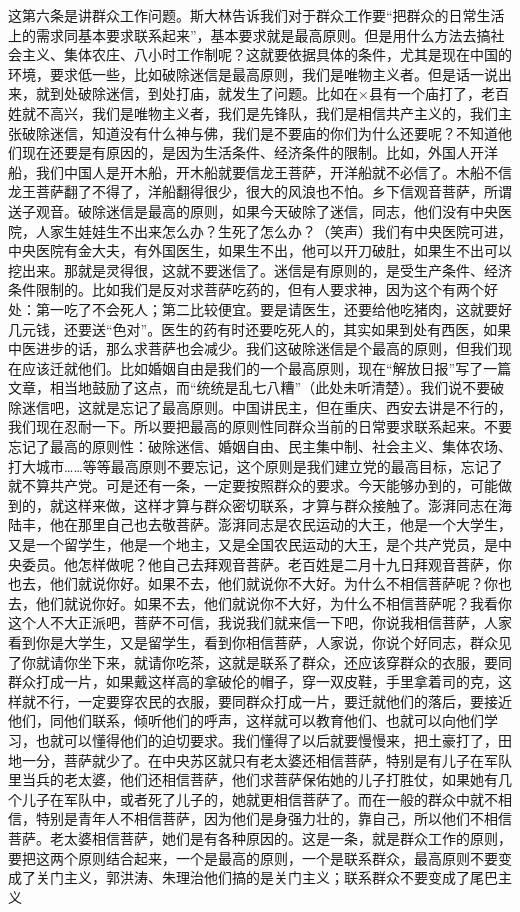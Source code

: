 这第六条是讲群众工作问题。斯大林告诉我们对于群众工作要“把群众的日常生活上的需求同基本要求联系起来”，基本要求就是最高原则。但是用什么方法去搞社会主义、集体农庄、八小时工作制呢？这就要依据具体的条件，尤其是现在中国的环境，要求低一些，比如破除迷信是最高原则，我们是唯物主义者。但是话一说出来，就到处破除迷信，到处打庙，就发生了问题。比如在×县有一个庙打了，老百姓就不高兴，我们是唯物主义者，我们是先锋队，我们是相信共产主义的，我们主张破除迷信，知道没有什么神与佛，我们是不要庙的你们为什么还要呢？不知道他们现在还要是有原因的，是因为生活条件、经济条件的限制。比如，外国人开洋船，我们中国人是开木船，开木船就要信龙王菩萨，开洋船就不必信了。木船不信龙王菩萨翻了不得了，洋船翻得很少，很大的风浪也不怕。乡下信观音菩萨，所谓送子观音。破除迷信是最高的原则，如果今天破除了迷信，同志，他们没有中央医院，人家生娃娃生不出来怎么办？生死了怎么办？（笑声）我们有中央医院可进，中央医院有金大夫，有外国医生，如果生不出，他可以开刀破肚，如果生不出可以挖出来。那就是灵得很，这就不要迷信了。迷信是有原则的，是受生产条件、经济条件限制的。比如我们是反对求菩萨吃药的，但有人要求神，因为这个有两个好处：第一吃了不会死人；第二比较便宜。要是请医生，还要给他吃猪肉，这就要好几元钱，还要送“色对”。医生的药有时还要吃死人的，其实如果到处有西医，如果中医进步的话，那么求菩萨也会减少。我们这破除迷信是个最高的原则，但我们现在应该迁就他们。比如婚姻自由是我们的一个最高原则，现在“解放日报”写了一篇文章，相当地鼓励了这点，而“统统是乱七八糟”（此处未听清楚）。我们说不要破除迷信吧，这就是忘记了最高原则。中国讲民主，但在重庆、西安去讲是不行的，我们现在忍耐一下。所以要把最高的原则性同群众当前的日常要求联系起来。不要忘记了最高的原则性：破除迷信、婚姻自由、民主集中制、社会主义、集体农场、打大城市……等等最高原则不要忘记，这个原则是我们建立党的最高目标，忘记了就不算共产党。可是还有一条，一定要按照群众的要求。今天能够办到的，可能做到的，就这样来做，这样才算与群众密切联系，才算与群众接触了。澎湃同志在海陆丰，他在那里自己也去敬菩萨。澎湃同志是农民运动的大王，他是一个大学生，又是一个留学生，他是一个地主，又是全国农民运动的大王，是个共产党员，是中央委员。他怎样做呢？他自己去拜观音菩萨。老百姓是二月十九日拜观音菩萨，你也去，他们就说你好。如果不去，他们就说你不大好。为什么不相信菩萨呢？你也去，他们就说你好。如果不去，他们就说你不大好，为什么不相信菩萨呢？我看你这个人不大正派吧，菩萨不可信，我说我们就来信一下吧，你说我相信菩萨，人家看到你是大学生，又是留学生，看到你相信菩萨，人家说，你说个好同志，群众见了你就请你坐下来，就请你吃茶，这就是联系了群众，还应该穿群众的衣服，要同群众打成一片，如果戴这样高的拿破伦的帽子，穿一双皮鞋，手里拿着司的克，这样就不行，一定要穿农民的衣服，要同群众打成一片，要迁就他们的落后，要接近他们，同他们联系，倾听他们的呼声，这样就可以教育他们、也就可以向他们学习，也就可以懂得他们的迫切要求。我们懂得了以后就要慢慢来，把土豪打了，田地一分，菩萨就少了。在中央苏区就只有老太婆还相信菩萨，特别是有儿子在军队里当兵的老太婆，他们还相信菩萨，他们求菩萨保佑她的儿子打胜仗，如果她有几个儿子在军队中，或者死了儿子的，她就更相信菩萨了。而在一般的群众中就不相信，特别是青年人不相信菩萨，因为他们是身强力壮的，靠自己，所以他们不相信菩萨。老太婆相信菩萨，她们是有各种原因的。这是一条，就是群众工作的原则，要把这两个原则结合起来，一个是最高的原则，一个是联系群众，最高原则不要变成了关门主义，郭洪涛、朱理治他们搞的是关门主义；联系群众不要变成了尾巴主义